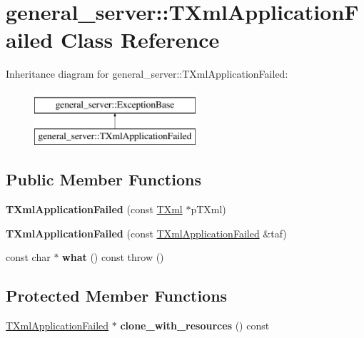 \hypertarget{classgeneral__server_1_1TXmlApplicationFailed}{\section{general\-\_\-server\-:\-:\-T\-Xml\-Application\-Failed \-Class \-Reference}
\label{classgeneral__server_1_1TXmlApplicationFailed}
}
\-Inheritance diagram for general\-\_\-server\-:\-:\-T\-Xml\-Application\-Failed\-:\begin{figure}[H]
\begin{center}
\leavevmode
\includegraphics[height=2.000000cm]{classgeneral__server_1_1TXmlApplicationFailed}
\end{center}
\end{figure}
\subsection*{\-Public \-Member \-Functions}
\begin{DoxyCompactItemize}
\item 
\hypertarget{classgeneral__server_1_1TXmlApplicationFailed_a9affaba1d45a1457d4c7f21cb6058c33}{{\bfseries \-T\-Xml\-Application\-Failed} (const \hyperlink{classgeneral__server_1_1TXml}{\-T\-Xml} $\ast$p\-T\-Xml)}\label{classgeneral__server_1_1TXmlApplicationFailed_a9affaba1d45a1457d4c7f21cb6058c33}

\item 
\hypertarget{classgeneral__server_1_1TXmlApplicationFailed_a398fc62dec81925c43e45480df51b52f}{{\bfseries \-T\-Xml\-Application\-Failed} (const \hyperlink{classgeneral__server_1_1TXmlApplicationFailed}{\-T\-Xml\-Application\-Failed} \&taf)}\label{classgeneral__server_1_1TXmlApplicationFailed_a398fc62dec81925c43e45480df51b52f}

\item 
\hypertarget{classgeneral__server_1_1TXmlApplicationFailed_a9a9cf1cb1eac64fcc1503d019c92baaa}{const char $\ast$ {\bfseries what} () const   throw ()}\label{classgeneral__server_1_1TXmlApplicationFailed_a9a9cf1cb1eac64fcc1503d019c92baaa}

\end{DoxyCompactItemize}
\subsection*{\-Protected \-Member \-Functions}
\begin{DoxyCompactItemize}
\item 
\hypertarget{classgeneral__server_1_1TXmlApplicationFailed_af759a35fc8c86d046620c5e0c1314ea7}{\hyperlink{classgeneral__server_1_1TXmlApplicationFailed}{\-T\-Xml\-Application\-Failed} $\ast$ {\bfseries clone\-\_\-with\-\_\-resources} () const }\label{classgeneral__server_1_1TXmlApplicationFailed_af759a35fc8c86d046620c5e0c1314ea7}

\end{DoxyCompactItemize}


